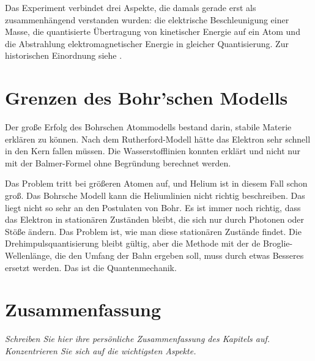 Das Experiment verbindet drei Aspekte, die damals gerade erst als zusammenhängend verstanden wurden: die elektrische Beschleunigung einer Masse, die quantisierte Übertragung von kinetischer Energie auf ein Atom und die Abstrahlung elektromagnetischer Energie in gleicher Quantisierung. Zur historischen Einordnung siehe \cite{Bleck-Neuhaus2022}.


\section{Grenzen des Bohr'schen Modells}

Der große Erfolg des Bohrschen Atommodells bestand darin, stabile Materie erklären zu können. Nach dem Rutherford-Modell hätte das Elektron sehr schnell in den Kern fallen müssen. Die Wasserstofflinien konnten erklärt und nicht nur mit der Balmer-Formel ohne Begründung berechnet werden.

Das Problem tritt bei größeren Atomen auf, und Helium ist in diesem Fall schon groß. Das Bohrsche Modell kann die Heliumlinien nicht richtig beschreiben. Das liegt nicht so sehr an den Postulaten von Bohr. Es ist immer noch richtig, dass das Elektron in stationären Zuständen bleibt, die sich nur durch Photonen oder Stöße ändern. Das Problem ist, wie man diese stationären Zustände findet. Die Drehimpulsquantisierung bleibt gültig, aber die Methode mit der de Broglie-Wellenlänge, die den Umfang der Bahn ergeben soll, muss durch etwas Besseres ersetzt werden. Das ist die Quantenmechanik.



\section{Zusammenfassung}

\textit{Schreiben Sie hier ihre persönliche Zusammenfassung des Kapitels auf. Konzentrieren Sie sich auf die wichtigsten Aspekte.}

\vspace*{10cm}


\printbibliography[segment=\therefsegment,heading=subbibliography]
